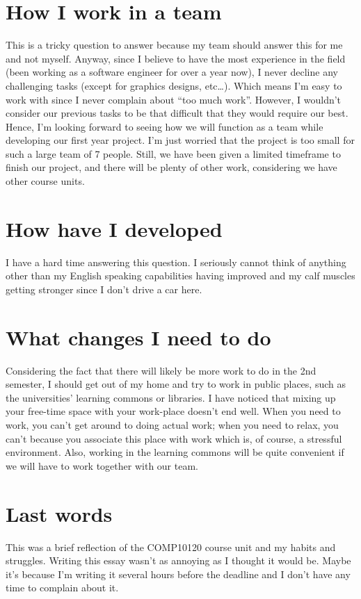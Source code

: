 \documentclass[a4paper]{article}
\begin{document}
\section*{How I work in a team}
This is a tricky question to answer because my team should answer this for me and not myself. Anyway, since I believe to have the most experience in the field (been working as a software engineer for over a year now), I never decline any challenging tasks (except for graphics designs, etc…). Which means I’m easy to work with since I never complain about “too much work”. However, I wouldn’t consider our previous tasks to be that difficult that they would require our best. Hence, I’m looking forward to seeing how we will function as a team while developing our first year project. I’m just worried that the project is too small for such a large team of 7 people. Still, we have been given a limited timeframe to finish our project, and there will be plenty of other work, considering we have other course units.
\section*{How have I developed}
I have a hard time answering this question. I seriously cannot think of anything other than my English speaking capabilities having improved and my calf muscles getting stronger since I don’t drive a car here.
\section*{What changes I need to do}
Considering the fact that there will likely be more work to do in the 2nd semester, I should get out of my home and try to work in public places, such as the universities’ learning commons or libraries. I have noticed that mixing up your free-time space with your work-place doesn’t end well. When you need to work, you can’t get around to doing actual work; when you need to relax, you can’t because you associate this place with work which is, of course, a stressful environment. Also, working in the learning commons will be quite convenient if we will have to work together with our team.
\section*{Last words}
This was a brief reflection of the COMP10120 course unit and my habits and struggles. Writing this essay wasn’t as annoying as I thought it would be. Maybe it’s because I’m writing it several hours before the deadline and I don’t have any time to complain about it.
\end{document}
